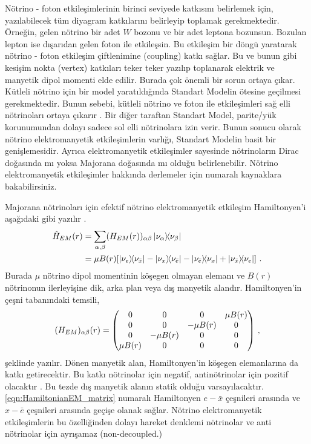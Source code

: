 Nötrino - foton etkileşimlerinin birinci seviyede katkısını belirlemek için, yazılabilecek tüm diyagram katkılarını belirleyip toplamak gerekmektedir. Örneğin, gelen nötrino bir adet $ W $ bozonu ve bir adet leptona bozunsun. Bozulan lepton ise dışarıdan gelen foton ile etkileşsin. Bu etkileşim bir döngü yaratarak nötrino - foton etkileşim çiftlenimine (coupling) katkı sağlar. Bu ve bunun gibi kesişim nokta (vertex) katkıları teker teker yazılıp toplanarak elektrik ve manyetik dipol momenti elde edilir. Burada çok önemli bir sorun ortaya çıkar. Kütleli nötrino için bir model yaratıldığında Standart Modelin ötesine geçilmesi gerekmektedir. Bunun sebebi, kütleli nötrino ve foton ile etkileşimleri sağ elli nötrinoları ortaya çıkarır \cite{Giunti:2014ixa}. Bir diğer taraftan Standart Model, parite/yük korunumundan dolayı sadece sol elli nötrinolara izin verir. Bunun sonucu olarak nötrino elektromanyetik etkileşimlerin varlığı, Standart Modelin basit bir genişlemesidir. Ayrıca elektromanyetik etkileşimler sayesinde nötrinoların Dirac doğasında mı yoksa Majorana doğasında mı olduğu belirlenebilir. Nötrino elektromanyetik etkileşimler hakkında derlemeler için \cite{Brdar:2020quo, Giunti:2014ixa,Broggini:2012df,BahaBalantekin:2018ppj} numaralı kaynaklara bakabilirsiniz.

Majorana nötrinoları için efektif nötrino elektromanyetik etkileşim Hamiltonyen'i aşağıdaki gibi yazılır \cite{Giunti:2014ixa}.
\begin{align}
	\nonumber \hat{H}_{EM}(r) &= \sum_{\alpha,\beta} (H_{EM}(r))_{\alpha\beta} \dyad{\nu_{\alpha}}{\nu_{\beta}}\\
	& =\mu B(r) \qty[\dyad{\nu_{e}}{\nu_{\bar{x}}}-\dyad{\nu_{x}}{\nu_{\bar{e}}}-\dyad{\nu_{\bar{e}}}{\nu_{x}}+\dyad{\nu_{\bar{x}}}{\nu_{e}}] \text{ .}
\end{align}
Burada $ \mu $ nötrino dipol momentinin köşegen olmayan elemanı ve $ B(r) $ nötrinonun ilerleyişine dik, arka plan veya dış manyetik alandır. Hamiltonyen'in çeşni tabanındaki temsili,
\begin{equation} \label{eqn:HamiltonianEM_matrix}
	(H_{EM})_{\alpha\beta}(r) = \mqty(0&0&0&\mu B(r)\\0&0&-\mu B(r)&0\\0&-\mu B(r)&0&0\\\mu B(r)&0&0&0) \text{ ,}
\end{equation}
şeklinde yazılır. Dönen manyetik alan, Hamiltonyen'in köşegen elemanlarına da katkı getirecektir. Bu katkı nötrinolar için negatif, antinötrinolar için pozitif olacaktır \cite{Likhachev:1990ki}. Bu tezde dış manyetik alanın statik olduğu varsayılacaktır. \eqref{eqn:HamiltonianEM_matrix} numaralı Hamiltonyen $ e-\bar{x} $ çeşnileri arasında ve $ x-\bar{e} $ çeşnileri arasında geçişe olanak sağlar. Nötrino elektromanyetik etkileşimlerin bu özelliğinden dolayı hareket denklemi nötrinolar ve anti nötrinolar için ayrışamaz (non-decoupled.) 

